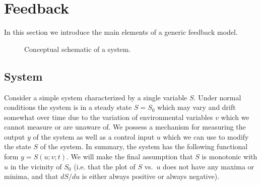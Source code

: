 \documentclass{article}
\begin{document}
\section{Feedback}
In this section we introduce the main elements of a generic feedback model.

\begin{figure}
 \begin{center}
 \end{center}
\caption{Conceptual schematic of a system.}
\label{fig:block_diagram_system_no_feedback}
\end{figure}

\subsection{System}
Consider a simple system characterized by a single variable $S$. Under normal conditions the system is in a steady state $S = S_0$ which may vary and drift somewhat over time due to the variation of environmental variables $v$ which we cannot measure or are unaware of. We possess a mechanism for measuring the output $y$ of the system\footnotemark{} as well as a control input $u$ which we can use to modify the state $S$ of the system. In summary, the system has the following functional form $y = S(u; v; t)$. We will make the final assumption that $S$ is monotonic with $u$ in the vicinity of $S_0$ (i.e. that the plot of $S$ vs.~$u$ does not have any maxima or minima, and that $dS/du$ is either always positive or always negative).
\end{document}
